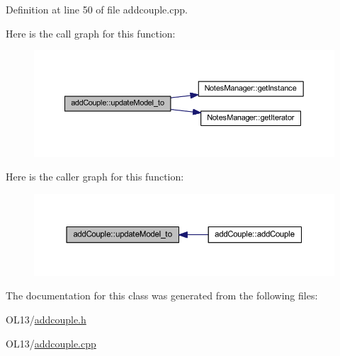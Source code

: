 Definition at line 50 of file addcouple.\+cpp.

Here is the call graph for this function\+:\nopagebreak
\begin{figure}[H]
\begin{center}
\leavevmode
\includegraphics[width=350pt]{classadd_couple_aa0334cda3e89d32093da234cbd1e8c07_cgraph}
\end{center}
\end{figure}
Here is the caller graph for this function\+:\nopagebreak
\begin{figure}[H]
\begin{center}
\leavevmode
\includegraphics[width=350pt]{classadd_couple_aa0334cda3e89d32093da234cbd1e8c07_icgraph}
\end{center}
\end{figure}


The documentation for this class was generated from the following files\+:\begin{DoxyCompactItemize}
\item 
O\+L13/\hyperlink{addcouple_8h}{addcouple.\+h}\item 
O\+L13/\hyperlink{addcouple_8cpp}{addcouple.\+cpp}\end{DoxyCompactItemize}
